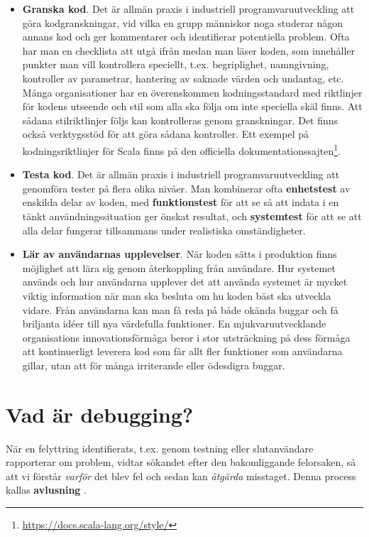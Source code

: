 \begin{itemize}
\item \textbf{Granska kod}. Det är allmän praxis i industriell programvaruutveckling att göra kodgranskningar, vid vilka en grupp människor noga studerar någon annans kod och ger kommentarer och identifierar potentiella problem. Ofta har man en checklista att utgå ifrån medan man läser koden, som innehåller punkter man vill kontrollera speciellt, t.ex. begriplighet, namngivning, kontroller av parametrar, hantering av saknade värden och undantag, etc. Många organisationer har en överenskommen kodningsstandard med riktlinjer för kodens utseende och stil som alla ska följa om inte speciella skäl finns. Att sådana stilriktlinjer följs kan kontrolleras genom granskningar. Det finns också verktygsstöd för att göra sådana kontroller. Ett exempel på kodningsriktlinjer för Scala finns på den officiella dokumentationssajten\footnote{\url{https://docs.scala-lang.org/style/}}. 

\item \textbf{Testa kod}. Det är allmän praxis i industriell programvaruutveckling att genomföra tester på flera olika nivåer. Man kombinerar ofta \textbf{enhetstest}  av enskilda delar av koden, med \textbf{funktionstest}  för att se så att indata i en tänkt användningssituation ger önskat resultat, och \textbf{systemtest}  för att se att alla delar fungerar tillsammans under realistiska omständigheter. 

\item \textbf{Lär av användarnas upplevelser}. När koden sätts i produktion finns möjlighet att lära sig genom återkoppling från användare. Hur systemet används och hur användarna upplever det att använda systemet är mycket viktig information när man ska besluta om hu koden bäst ska utveckla vidare. Från användarna kan man få reda på både okända buggar och få briljanta idéer till nya värdefulla funktioner. En mjukvaruutvecklande organisations innovationsförmåga beror i stor utsträckning på dess förmåga att kontinuerligt leverera kod som får allt fler funktioner som användarna gillar, utan att för många irriterande eller ödesdigra buggar.

\end{itemize}



\section{Vad är debugging?}

När en felyttring identifierats, t.ex. genom testning eller slutanvändare rapporterar om problem, vidtar sökandet efter den bakomliggande felorsaken, så att vi förstår \emph{varför} det blev fel och sedan kan \emph{åtgärda} misstaget. Denna process kallas \textbf{avlusning} .




